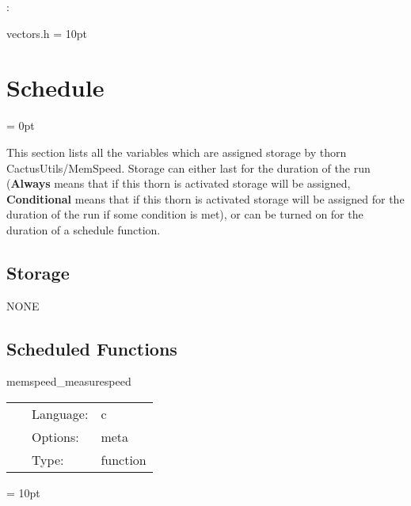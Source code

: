 \vspace{5mm}

: 

vectors.h
\vspace{2mm}\parskip = 10pt 

\section{Schedule} 


\parskip = 0pt


\noindent This section lists all the variables which are assigned storage by thorn CactusUtils/MemSpeed.  Storage can either last for the duration of the run ({\bf Always} means that if this thorn is activated storage will be assigned, {\bf Conditional} means that if this thorn is activated storage will be assigned for the duration of the run if some condition is met), or can be turned on for the duration of a schedule function.


\subsection*{Storage}NONE
\subsection*{Scheduled Functions}
\vspace{5mm}


\hspace{5mm} memspeed\_measurespeed 

\hspace{5mm}{\it measure cpu, memory, cache speeds } 


\hspace{5mm}

 \begin{tabular*}{160mm}{cll} 
~ & Language:  & c \\ 
~ & Options:  & meta \\ 
~ & Type:  & function \\ 
\end{tabular*} 



\vspace{5mm}\parskip = 10pt 

